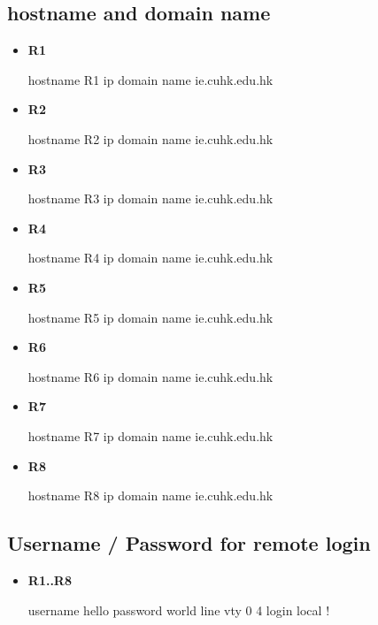 \documentclass[10pt]{article}
\begin{document}
\subsection{hostname and domain name}
\begin{itemize}
\item {\bf R1}
\begin{verbatim*}
hostname R1
ip domain name ie.cuhk.edu.hk
\end{verbatim*}
\item {\bf R2}
\begin{verbatim*}
hostname R2
ip domain name ie.cuhk.edu.hk
\end{verbatim*}
\item {\bf R3}
\begin{verbatim*}
hostname R3
ip domain name ie.cuhk.edu.hk
\end{verbatim*}
\item {\bf R4}
\begin{verbatim*}
hostname R4
ip domain name ie.cuhk.edu.hk
\end{verbatim*}
\item {\bf R5}
\begin{verbatim*}
hostname R5
ip domain name ie.cuhk.edu.hk
\end{verbatim*}
\item {\bf R6}
\begin{verbatim*}
hostname R6
ip domain name ie.cuhk.edu.hk
\end{verbatim*}
\item {\bf R7}
\begin{verbatim*}
hostname R7
ip domain name ie.cuhk.edu.hk
\end{verbatim*}
\item {\bf R8}
\begin{verbatim*}
hostname R8
ip domain name ie.cuhk.edu.hk
\end{verbatim*}
\end{itemize}
\subsection{Username / Password for remote login}
\begin{itemize}
\item {\bf R1..R8}
\begin{verbatim*}
username hello password world
line vty 0 4
 login local
!
\end{verbatim*}
\end{itemize}
\end{document}

